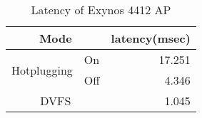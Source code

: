 \begin{table}[tb]
\begin{center}
\begin{footnotesize}
\begin{tabular}{l|l|r}
\hline \hline
\multicolumn{2}{c|}{Mode}	& 	latency(msec)	\\
\hline
\multirow{2}{*}{Hotplugging}	&	On	&	17.251 \\\cline{2-3}
				&	Off	& 4.346 \\
\hline
\multicolumn{2}{c|}{DVFS}	&	1.045	\\
\hline \hline
\end{tabular}
\end{footnotesize}
\end{center}
\caption{Latency of Exynos 4412 AP}
\label{tab:exynos_latency}
\end{table}

\begin{comment}
\multirow{2}{*}{Idle}		&	Clock gating	&	0.001 \\ \cline{2-3}
				&	HW power down	& 	0.300 \\

[Clock gating(WFI(Wait For Interrupt))]

WFI and WFE Standby modes disable most of the clocks of a processor, while keeping
its logic powered up. This reduces the power drawn to the static leakage current, leaving
a tiny clock power overhead requirement to enable the device to wake up.
Entry into WFI Standby mode is performed by executing the WFI instruction.


[ARM Power down mode]

Shutdown mode powers down the entire device, and all state, including cache, must be saved
externally by software. This state saving is performed with interrupts disabled, and finishes with
a Data Synchronization Barrier operation. The Cortex-A9 processor then communicates with a
power controller that the device is ready to be powered down in the same manner as when
entering Dormant Mode. The processor is returned to the run state by asserting reset.
\end{comment}
